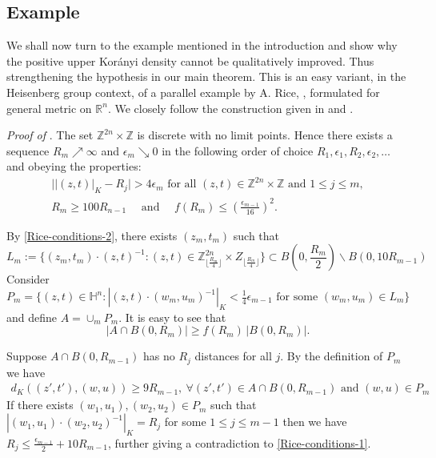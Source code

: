 \documentclass[11pt, reqno]{amsart}
\theoremstyle{plain}
\newcommand{\R}{\ensuremath{\mathbb{R_+}}}
\theoremstyle{remark}
\theoremstyle{example}
\theoremstyle{definition}
\numberwithin{equation}{section}
\def\R{\mathbb{R}}
\begin{document}
\subsection{Example}\label{Example Rice based}%
We shall now turn to the example mentioned in the introduction and show why the positive upper Kor\'anyi density cannot be qualitatively improved. Thus strengthening the hypothesis in our main theorem. This is an easy variant, in the Heisenberg group context, of a parallel example by A. Rice, \cite{2020Rice}, formulated for general metric on $\R^n$. We closely follow the construction given in \cite{2020Rice} and \cite{Pramanik-Raani2023}.

{\emph{Proof of }.}
The set  $\mathbb Z^{2n}\times \mathbb Z$ is  discrete with no limit points.  Hence there exists a sequence $ R_m \nearrow \infty$ and $\epsilon_m \searrow 0$ in the following order of choice $ R_1, \epsilon_1,  R_2, \epsilon_2, \ldots$ and obeying the properties: 
\begin{align} 
 \bigl| |(z,t)|_K -  R_j \bigr| > 4\epsilon_m \text{ for all $(z,t) \in \mathbb Z^{2n}\times\mathbb Z$ and } 1 \leq j \leq m,  \label{Rice-conditions-1} \\ \label{Rice-conditions-2}   R_m \geq 100  R_{n-1} \quad \text{ and } \quad f( R_{m})\leq \left(\frac{\epsilon_{m-1}}{16}\right)^2.
 \end{align}  

 By \eqref{Rice-conditions-2}, there exists $(z_m,t_m)$ such that 
 \begin{equation*}
     L_m:=\{(z_m,t_m)\cdot (z,t)^{-1}: (z,t) \in \mathbb Z^{2n}_{\lfloor \frac{ R_m}4\rfloor}\times Z_{\lfloor \frac{ R_m}4\rfloor}\} \subset B\left(0,{\textstyle\frac{ R_m}{2} }\right)\backslash B(0,10 R_{m-1})
 \end{equation*}
Consider $P_m=\{(z,t)\in \mathbb H^n: |(z,t)\cdot (w_m,u_m)^{-1} |_K<\frac14\epsilon_{m-1} \text{ for some }(w_m,u_m)\in L_m\}$ and define $A=\cup_mP_m$. It is easy to see that $$|A\cap B(0, R_m)|\geq f(R_m) \, |B(0, R_m)|.$$

Suppose $A\cap B(0, R_{m-1})$ has no $R_j$ distances for all $j$. By the definition of $P_m$ we have 
\begin{align*}
    d_K((z',t'),(w,u)) \geq  9 R_{m-1},\ \forall (z',t')\in A\cap B(0,  R_{m-1})\text{ and }(w,u)\in P_m
\end{align*}
If there exists $(w_1,u_1),(w_2,u_2)\in P_m$ such that $|(w_1,u_1)\cdot(w_2,u_2)^{-1} |_{K} =  R_j$ for some $1\leq j\leq m-1$ then we have $R_j\leq \frac{\epsilon_{m-1}}2+10 R_{m-1}$, further giving a contradiction to \eqref{Rice-conditions-1}.
\end{document}

